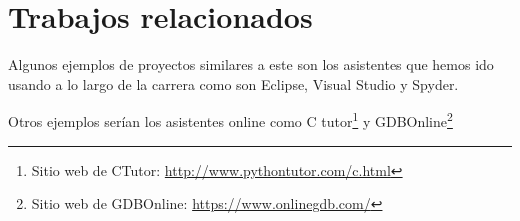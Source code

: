 \chapter{Trabajos relacionados}

Algunos ejemplos de proyectos similares a este son los asistentes que hemos ido usando a lo largo de la carrera como son Eclipse, Visual Studio y Spyder.

Otros ejemplos serían los asistentes online como C tutor\footnote{Sitio web de CTutor: \url{http://www.pythontutor.com/c.html}} y GDBOnline\footnote{Sitio web de GDBOnline: \url{https://www.onlinegdb.com/}}

